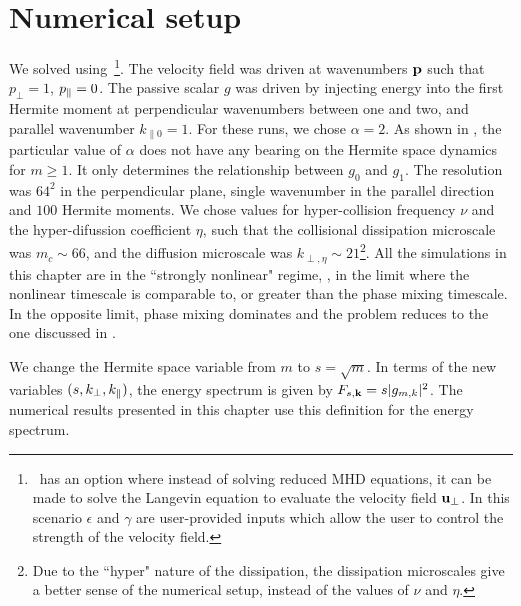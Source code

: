 \section{Numerical setup}
    We solved  using \Gand\,\footnote{\Gand\ has an
    option where instead of solving reduced MHD equations, it can be made to solve the Langevin
    equation to evaluate the velocity field $\mathbf{u}_\perp$. In this scenario $\epsilon$ and $\gamma$ are
    user-provided inputs which allow the user to control the strength of the velocity
    field.}. The velocity field was driven at wavenumbers $\mathbf{p}$ such that $p_\perp=1$,
    $p_\parallel=0$. The passive scalar $g$ was driven by injecting energy into the first Hermite
    moment at perpendicular wavenumbers between one
    and two, and parallel wavenumber $k_{\parallel0} = 1$. For these runs, we chose
    $\alpha=2$. As shown in , the particular value of $\alpha$ does
    not have any bearing on the Hermite space dynamics for $m\geq1$. It only determines the
    relationship between $g_0$ and $g_1$.
    The resolution
    was $64^2$ in the perpendicular plane, single wavenumber in the parallel direction and $100$ Hermite
    moments. We chose values for hyper-collision frequency $\nu$ and the hyper-difussion
    coefficient $\eta$, such that the collisional
    dissipation microscale was $m_c \sim 66$, and the
    diffusion microscale was $k_{\perp, \eta}\sim 21$\footnote{Due to the ``hyper" nature
    of the dissipation, the dissipation microscales give a better sense of the numerical
    setup, instead of the values of $\nu$ and $\eta$.}. 
    All the simulations in this chapter are in the ``strongly nonlinear" regime,
    \ie, in the limit where the nonlinear timescale is comparable to, or greater than the
    phase mixing timescale. In the opposite limit, phase mixing dominates and the problem
    reduces to the one discussed in .

    We change the Hermite space variable from $m$ to $s=\sqrt{m}$. 
    In terms of the new variables
    $(s, k_\perp, k_\parallel)$, the energy spectrum is given by $F_{s,\mathbf{k}} = s |g_{m,k}|^2$. The
    numerical results presented in this chapter use this definition for the energy
    spectrum.
    

